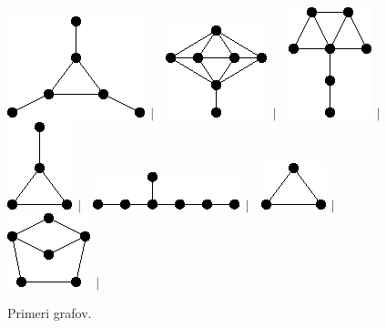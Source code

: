 \documentclass[11pt,paper=b5,footinclude,headinclude]{scrbook} %
\newtheorem{ex}{Vaja\hypertarget{sol:\theex}}[chapter]
\begin{document}
\begin{ex}
\begin{figure}
\includegraphics[scale=0.5]{smallGraphs/g_net.png}$\,\mid\,$\
\includegraphics[scale=0.5]{smallGraphs/g_parachute.png}$\,\mid\,$\
\includegraphics[scale=0.5]{smallGraphs/g_parapluie.png}$\,\mid\,$\
\includegraphics[scale=0.5]{smallGraphs/g_paw.png}$\,\mid\,$\
\includegraphics[scale=0.5]{smallGraphs/g_skewstar.png}$\,\mid\,$\
\includegraphics[scale=0.5]{smallGraphs/g_triangle.png}$\,\mid\,$\
\includegraphics[scale=0.5]{smallGraphs/g_twinC5.png}$\,\mid\,$\
  	\caption{Primeri grafov.}
  	\label{fig:enter-label}
  \end{figure}
\end{ex}
\end{document}
